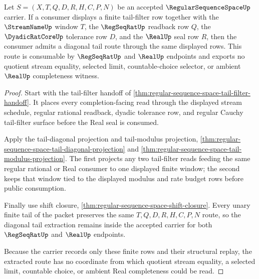 \begin{theorem}
\label{thm:regular-sequence-space-diagonal-tail-extraction}
Let $S=(X,T,Q,D,R,H,C,P,N)$ be an accepted $\RegularSequenceSpaceUp$ carrier. If a consumer displays a finite tail-filter row together with the $\StreamNameUp$ window $T$, the $\RegSeqRatUp$ readback row $Q$, the $\DyadicRatCoreUp$ tolerance row $D$, and the $\RealUp$ seal row $R$, then the consumer admits a diagonal tail route through the same displayed rows. This route is consumable by $\RegSeqRatUp$ and $\RealUp$ endpoints and exports no quotient stream equality, selected limit, countable-choice selector, or ambient $\RealUp$ completeness witness.
\end{theorem}
\begin{proof}
Start with the tail-filter handoff of \autoref{thm:regular-sequence-space-tail-filter-handoff}. It places every completion-facing read through the displayed stream schedule, regular rational readback, dyadic tolerance row, and regular Cauchy tail-filter surface before the Real seal is consumed.

Apply the tail-diagonal projection and tail-modulus projection, \autoref{thm:regular-sequence-space-tail-diagonal-projection} and \autoref{thm:regular-sequence-space-tail-modulus-projection}. The first projects any two tail-filter reads feeding the same regular rational or Real consumer to one displayed finite window; the second keeps that window tied to the displayed modulus and rate budget rows before public consumption.

Finally use shift closure, \autoref{thm:regular-sequence-space-shift-closure}. Every unary finite tail of the packet preserves the same $T,Q,D,R,H,C,P,N$ route, so the diagonal tail extraction remains inside the accepted carrier for both $\RegSeqRatUp$ and $\RealUp$ endpoints.

Because the carrier records only these finite rows and their structural replay, the extracted route has no coordinate from which quotient stream equality, a selected limit, countable choice, or ambient Real completeness could be read.
\end{proof}

